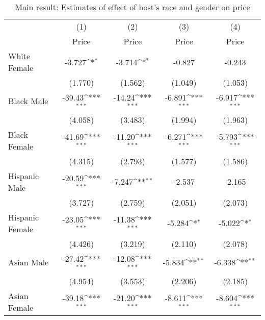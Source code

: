 {
\def\sym#1{\ifmmode^{#1}\else\(^{#1}\)\fi}
\begin{longtable}{l*{4}{c}}
\caption{Main result: Estimates of effect of host's race and gender on price} \label{table:price}\\
\hline\hline\endfirsthead\hline\endhead\hline\endfoot\endlastfoot
                    &\multicolumn{1}{c}{(1)}&\multicolumn{1}{c}{(2)}&\multicolumn{1}{c}{(3)}&\multicolumn{1}{c}{(4)}\\
                    &\multicolumn{1}{c}{Price}&\multicolumn{1}{c}{Price}&\multicolumn{1}{c}{Price}&\multicolumn{1}{c}{Price}\\
\hline
White Female        &      -3.727\sym{*}  &      -3.714\sym{*}  &      -0.827         &      -0.243         \\
                    &     (1.770)         &     (1.562)         &     (1.049)         &     (1.053)         \\
[1em]
Black Male          &      -39.43\sym{***}&      -14.24\sym{***}&      -6.891\sym{***}&      -6.917\sym{***}\\
                    &     (4.058)         &     (3.483)         &     (1.994)         &     (1.963)         \\
[1em]
Black Female        &      -41.69\sym{***}&      -11.20\sym{***}&      -6.271\sym{***}&      -5.793\sym{***}\\
                    &     (4.315)         &     (2.793)         &     (1.577)         &     (1.586)         \\
[1em]
Hispanic Male       &      -20.59\sym{***}&      -7.247\sym{**} &      -2.537         &      -2.165         \\
                    &     (3.727)         &     (2.759)         &     (2.051)         &     (2.073)         \\
[1em]
Hispanic Female     &      -23.05\sym{***}&      -11.38\sym{***}&      -5.284\sym{*}  &      -5.022\sym{*}  \\
                    &     (4.426)         &     (3.219)         &     (2.110)         &     (2.078)         \\
[1em]
Asian Male          &      -27.42\sym{***}&      -12.08\sym{***}&      -5.834\sym{**} &      -6.338\sym{**} \\
                    &     (4.954)         &     (3.553)         &     (2.206)         &     (2.185)         \\
[1em]
Asian Female        &      -39.18\sym{***}&      -21.20\sym{***}&      -8.611\sym{***}&      -8.604\sym{***}\\

\end{longtable}}
